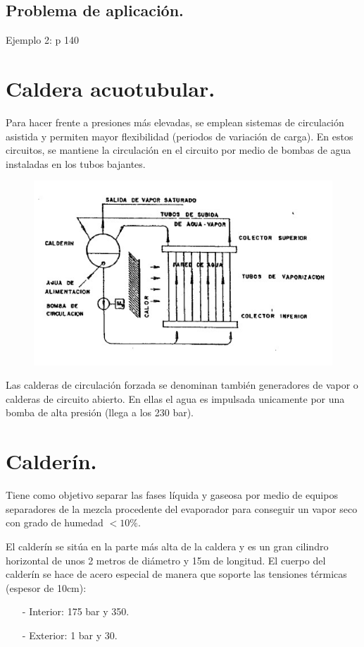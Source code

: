 \subsection{Problema de aplicación.}
Ejemplo 2: p 140
\section{Caldera acuotubular.}
Para hacer frente a presiones más elevadas, se emplean sistemas de circulación asistida y permiten mayor flexibilidad (periodos de variación de carga). En estos circuitos, se mantiene la circulación en el circuito por medio de bombas de agua instaladas en los tubos bajantes.
\begin{figure}[H]
	\centering
	\includegraphics[width=0.7\linewidth]{res/tema10/autotubu}
	\label{fig:autotubu}
\end{figure}



Las calderas de circulación forzada se denominan también generadores de vapor o calderas de circuito abierto. En ellas el agua es impulsada unicamente por una bomba de alta presión (llega a los 230 bar).
\section{Calderín.}
Tiene como objetivo separar las fases líquida y gaseosa por medio de equipos separadores de la mezcla procedente del evaporador para conseguir un vapor seco con grado de humedad $<10\%$. 



El calderín se sitúa en la parte más alta de la caldera y es un gran cilindro horizontal de unos 2 metros de diámetro y 15m de longitud. El cuerpo del calderín se hace de acero especial de manera que soporte las tensiones térmicas (espesor de 10cm):
\begin{itemize}
	\item [-] Interior: 175 bar y 350\grado.
	\item [-] Exterior: 1 bar y 30\grado.
\end{itemize}




